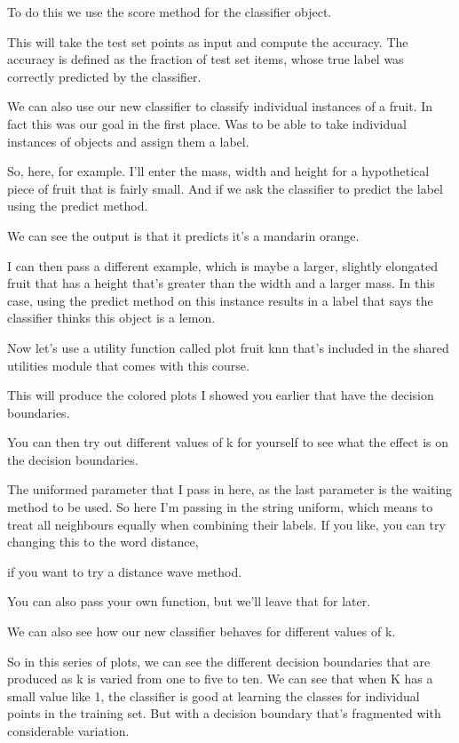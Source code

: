 \begin{multicols}{2}
To do this we use the score method for the classifier object. 

This will take the test set points as input and compute the accuracy. The accuracy is defined as the fraction of test set items, whose true label was correctly predicted by the classifier. 

We can also use our new classifier to classify individual instances of a fruit. In fact this was our goal in the first place. Was to be able to take individual instances of objects and assign them a label. 

So, here, for example. I'll enter the mass, width and height for a hypothetical piece of fruit that is fairly small. And if we ask the classifier to predict the label using the predict method. 

We can see the output is that it predicts it's a mandarin orange. 

I can then pass a different example, which is maybe a larger, slightly elongated fruit that has a height that's greater than the width and a larger mass. In this case, using the predict method on this instance results in a label that says the classifier thinks this object is a lemon. 

Now let's use a utility function called plot fruit knn that's included in the shared utilities module that comes with this course. 

This will produce the colored plots I showed you earlier that have the decision boundaries. 

You can then try out different values of k for yourself to see what the effect is on the decision boundaries. 

The uniformed parameter that I pass in here, as the last parameter is the waiting method to be used. So here I'm passing in the string uniform, which means to treat all neighbours equally when combining their labels. If you like, you can try changing this to the word distance, 

if you want to try a distance wave method. 

You can also pass your own function, but we'll leave that for later. 

We can also see how our new classifier behaves for different values of k. 

So in this series of plots, we can see the different decision boundaries that are produced as k is varied from one to five to ten. We can see that when K has a small value like 1, the classifier is good at learning the classes for individual points in the training set. But with a decision boundary that's fragmented with considerable variation. 


\end{multicols}
